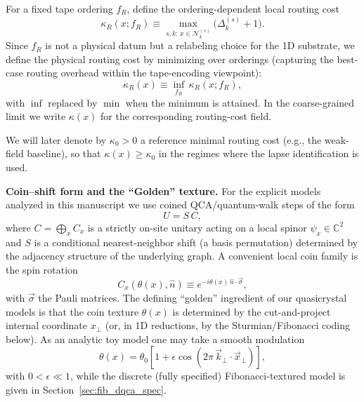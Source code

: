 \begin{definition}
\label{def:routing_cost_field}
For a fixed tape ordering $f_R$, define the ordering-dependent local routing cost
\begin{equation}
    \kappa_R(x;f_R)\equiv \max_{s,k:\,x\in \mathcal{N}_k^{(s)}}\big(\Delta_k^{(s)}+1\big).
\end{equation}
Since $f_R$ is not a physical datum but a relabeling choice for the 1D substrate, we define the physical routing cost by minimizing over orderings (capturing the best-case routing overhead within the tape-encoding viewpoint):
\begin{equation}
    \kappa_R(x)\equiv \inf_{f_R}\,\kappa_R(x;f_R),
\end{equation}
with $\inf$ replaced by $\min$ when the minimum is attained.
In the coarse-grained limit we write $\kappa(x)$ for the corresponding routing-cost field.
\end{definition}
We will later denote by $\kappa_0>0$ a reference minimal routing cost (e.g., the weak-field baseline), so that $\kappa(x)\ge \kappa_0$ in the regimes where the lapse identification is used.
\par
\noindent\textbf{Coin--shift form and the ``Golden'' texture.}
For the explicit models analyzed in this manuscript we use coined QCA/quantum-walk steps of the form
\begin{equation}
    U = S\,C,
\end{equation}
where $C=\bigoplus_x C_x$ is a strictly on-site unitary acting on a local spinor $\psi_x\in\mathbb{C}^2$ and $S$ is a conditional nearest-neighbor shift (a basis permutation) determined by the adjacency structure of the underlying graph.
A convenient local coin family is the spin rotation
\begin{equation}
    C_x(\theta(x),\hat{n})\equiv e^{-i\theta(x)\,\hat{n}\cdot\vec{\sigma}},
\end{equation}
with $\vec{\sigma}$ the Pauli matrices. The defining ``golden'' ingredient of our quasicrystal models is that the coin texture $\theta(x)$ is determined by the cut-and-project internal coordinate $x_\perp$ (or, in 1D reductions, by the Sturmian/Fibonacci coding below). As an analytic toy model one may take a smooth modulation
\begin{equation}
    \theta(x)=\theta_0\left[1+\epsilon\cos\!\left(2\pi\,\vec{k}_\perp\cdot \vec{x}_\perp\right)\right],
\end{equation}
with $0<\epsilon\ll 1$, while the discrete (fully specified) Fibonacci-textured model is given in Section~\ref{sec:fib_dqca_spec}.

